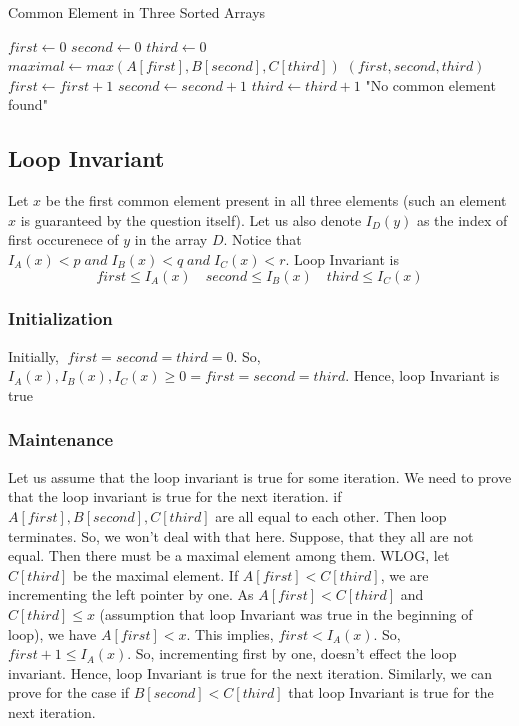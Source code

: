 \documentclass[12pt]{article}
\begin{document}
\begin{algorithm}[H]
\caption{Common Element in Three Sorted Arrays}
\begin{algorithmic}[1]
    \State $first \gets 0$
    \State $second \gets 0$
    \State $third \gets 0$
        \State $maximal \gets max(A[first], B[second], C[third])$
            \State \Return $(first, second, third)$
        \EndIf
            \State $first \gets first + 1$
        \EndIf
            \State $second \gets second + 1$
        \EndIf
            \State $third \gets third + 1$
        \EndIf
    \EndWhile
    \State \Return "No common element found"
\EndFunction
\end{algorithmic}
\end{algorithm}

\subsection*{Loop Invariant}
Let $x$ be the first common element present in all three elements (such an element $x$ is guaranteed by the question itself). Let us also denote $I_D(y)$ as the index of first occurenece of $y$ in the array $D$. Notice that $ I_A(x) < p \; and \; I_B(x) < q \; and \; I_C(x) < r$. Loop Invariant is $$first \leq I_A(x) \quad second \leq I_B(x) \quad third \leq I_C(x) $$ 

\subsubsection*{Initialization}
Initially, $ \; first = second = third = 0$. So, $I_A(x), I_B(x), I_C(x) \geq 0 = first = second = third$. Hence, loop Invariant is true

\subsubsection*{Maintenance}
Let us assume that the loop invariant is true for some iteration. We need to prove that the loop invariant is true for the next iteration. if $A[first], B[second], C[third]$ are all equal to each other. Then loop terminates. So, we won't deal with that here. Suppose, that they all are not equal. Then there must be a maximal element among them. WLOG, let $C[third]$ be the maximal element. If $A[first] < C[third]$, we are incrementing the left pointer by one. As $A[first] < C[third]$ and $C[third] \leq x$ (assumption that loop Invariant was true in the beginning of loop), we have $A[first] < x$. 
This implies, $first < I_A(x)$. So, $first + 1 \leq I_A(x)$. So, incrementing first by one, doesn't effect the loop invariant. Hence, loop Invariant is true for the next iteration. Similarly, we can prove for the case if $B[second] < C[third]$ that loop Invariant is true for the next iteration.
\end{document}
